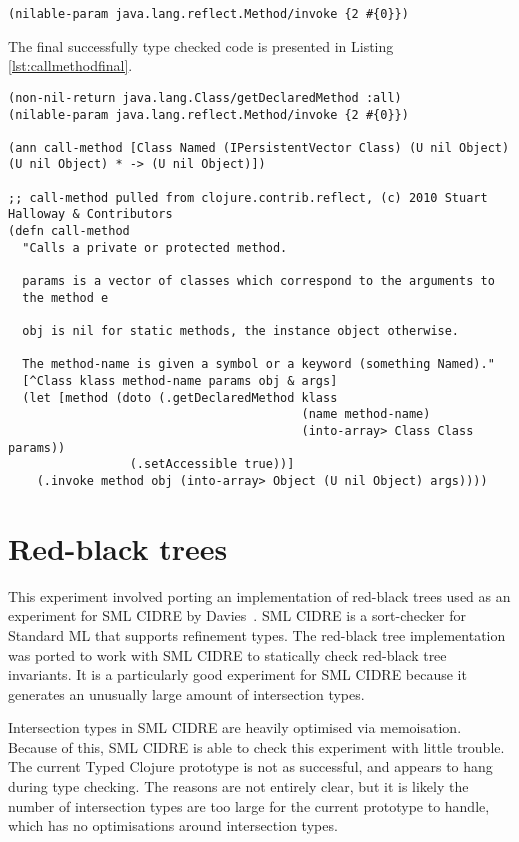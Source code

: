 \begin{lstlisting}
(nilable-param java.lang.reflect.Method/invoke {2 #{0}})
\end{lstlisting}

The final successfully type checked code is presented in Listing \ref{lst:callmethodfinal}.

\begin{lstlisting}[caption=Type Annotated code for call-method, label=lst:callmethodfinal]
(non-nil-return java.lang.Class/getDeclaredMethod :all)
(nilable-param java.lang.reflect.Method/invoke {2 #{0}})

(ann call-method [Class Named (IPersistentVector Class) (U nil Object) (U nil Object) * -> (U nil Object)])

;; call-method pulled from clojure.contrib.reflect, (c) 2010 Stuart Halloway & Contributors
(defn call-method
  "Calls a private or protected method.

  params is a vector of classes which correspond to the arguments to
  the method e

  obj is nil for static methods, the instance object otherwise.

  The method-name is given a symbol or a keyword (something Named)."
  [^Class klass method-name params obj & args]
  (let [method (doto (.getDeclaredMethod klass 
                                         (name method-name)
                                         (into-array> Class Class params))
                 (.setAccessible true))]
    (.invoke method obj (into-array> Object (U nil Object) args))))
\end{lstlisting}

\section{Red-black trees}

This experiment involved porting an implementation of red-black trees
used as an experiment for SML CIDRE by Davies~\cite{Dav05}.
SML CIDRE is a sort-checker for Standard ML that supports refinement
types.
The red-black tree implementation was ported to work with SML CIDRE
to statically check red-black tree invariants.
It is a particularly good experiment for SML CIDRE because it generates an unusually large
amount of intersection types.

Intersection types in SML CIDRE are heavily optimised via memoisation.
Because of this, SML CIDRE is able to check this experiment with little trouble.
The current Typed Clojure prototype is not as successful, and appears to hang
during type checking.
The reasons are not entirely clear, but it is likely the number of intersection types
are too large for the current prototype to handle, which has no optimisations
around intersection types.

